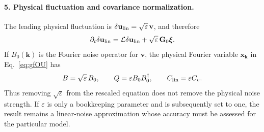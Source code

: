 \documentclass{article}
\begin{document}
\paragraph{5. Physical fluctuation and covariance normalization.}
The leading physical fluctuation is $\delta\mathbf u_{\rm lin}=\sqrt{\varepsilon}\,\mathbf v$, and therefore
\begin{equation}
    \partial_t\delta\mathbf u_{\rm lin}
    =\mathcal L\delta\mathbf u_{\rm lin}
    +\sqrt{\varepsilon}\,\mathbf G_0\boldsymbol\xi.
\end{equation}
If $B_0(\mathbf k)$ is the Fourier noise operator for $\mathbf v$, the physical Fourier variable $\mathbf x_{\mathbf k}$ in Eq.~\eqref{eq:gfOU} has
\begin{equation}
    B=\sqrt{\varepsilon}\,B_0,\qquad Q=\varepsilon B_0B_0^\dagger,
    \qquad C_{\rm lin}=\varepsilon C_v.
\end{equation}
Thus removing $\sqrt{\varepsilon}$ from the rescaled equation does not remove the physical noise strength. If $\varepsilon$ is only a bookkeeping parameter and is subsequently set to one, the result remains a linear-noise approximation whose accuracy must be assessed for the particular model.
\end{document}

